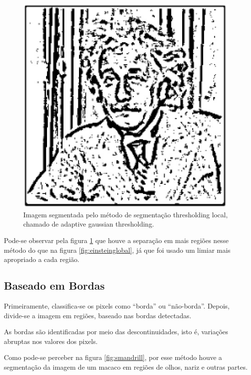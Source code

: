  \begin{figure}[!htb]
       \begin{center}  
          \includegraphics[width=0.3\columnwidth]{img/einstein-localthresholding-adaptivegausian.jpg}
           \caption{\label{fig:einsteinlocal}Imagem segmentada pelo método de segmentação thresholding local, chamado de adaptive gaussian  thresholding.}
       \end{center}
   \end{figure}
   
   Pode-se observar pela figura \ref{fig:einsteinlocal} que houve a separação em mais regiões nesse método do que na figura \ref{fig:einsteinglobal}, já que foi usado um limiar mais apropriado a cada região.

\subsection{Baseado em Bordas}
Primeiramente, classifica-se os pixels como “borda” ou “não-borda”.
Depois, divide-se a imagem em regiões, baseado nas bordas detectadas.

As bordas são identificadas por meio das descontinuidades, isto é, variações abruptas nos valores dos pixels. 

Como pode-se perceber na figura \ref{fig:smandrill}, por esse método houve a segmentação da imagem de um macaco em regiões de olhos, nariz e outras partes. 


